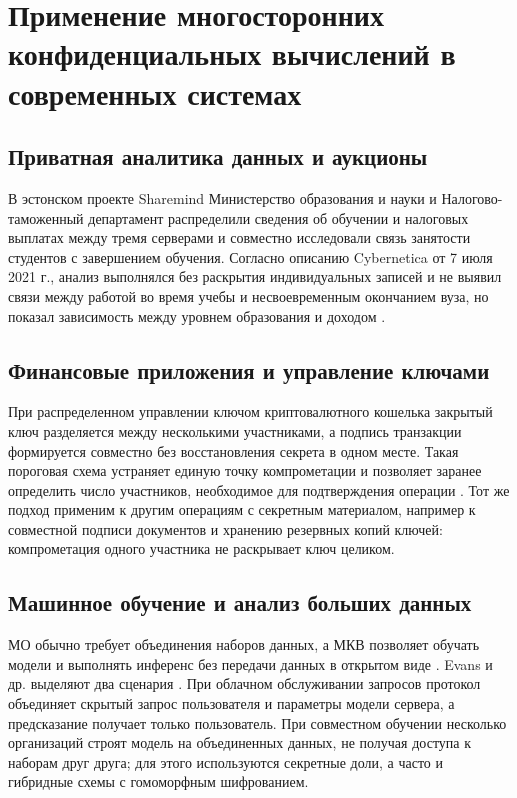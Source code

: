 \section{Применение многосторонних конфиденциальных вычислений в современных системах}
\label{sec:applications}

\subsection{Приватная аналитика данных и аукционы}

В эстонском проекте Sharemind Министерство образования и науки и Налогово-таможенный департамент распределили сведения об обучении и налоговых выплатах между тремя серверами и совместно исследовали связь занятости студентов с завершением обучения. Согласно описанию Cybernetica от 7 июля 2021 г., анализ выполнялся без раскрытия индивидуальных записей и не выявил связи между работой во время учебы и несвоевременным окончанием вуза, но показал зависимость между уровнем образования и доходом \cite{18}.

\subsection{Финансовые приложения и управление ключами}

При распределенном управлении ключом криптовалютного кошелька закрытый ключ разделяется между несколькими участниками, а подпись транзакции формируется совместно без восстановления секрета в одном месте. Такая пороговая схема устраняет единую точку компрометации и позволяет заранее определить число участников, необходимое для подтверждения операции \cite{06}. Тот же подход применим к другим операциям с секретным материалом, например к совместной подписи документов и хранению резервных копий ключей: компрометация одного участника не раскрывает ключ целиком.

\subsection{Машинное обучение и анализ больших данных}
\label{subsec:ml-applications}

МО обычно требует объединения наборов данных, а МКВ позволяет обучать модели и выполнять инференс без передачи данных в открытом виде \cite{04}. Evans и др. выделяют два сценария \cite{06}. При облачном обслуживании запросов протокол объединяет скрытый запрос пользователя и параметры модели сервера, а предсказание получает только пользователь. При совместном обучении несколько организаций строят модель на объединенных данных, не получая доступа к наборам друг друга; для этого используются секретные доли, а часто и гибридные схемы с гомоморфным шифрованием.


